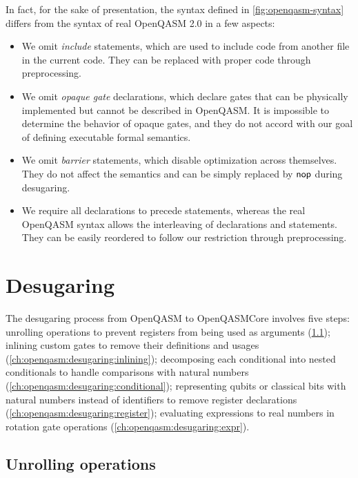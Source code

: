 In fact, for the sake of presentation, the syntax defined in
\cref{fig:openqasm-syntax} differs from the syntax of real OpenQASM 2.0 in a
few aspects:
%
\begin{itemize}
	\item We omit \emph{include} statements, which are used to include code from another
	      file in the current code.
	      They can be replaced with proper code through preprocessing.
	\item We omit \emph{opaque gate} declarations, which declare gates that can be
	      physically implemented but cannot be described in OpenQASM.
	      It is impossible to determine the behavior of opaque gates, and they do not
	      accord with our goal of defining executable formal semantics.
	\item We omit \emph{barrier} statements, which disable optimization across
	      themselves.
	      They do not affect the semantics and can be simply replaced by $\mathsf{nop}$ during
	      desugaring.
	\item We require all declarations to precede statements, whereas the real OpenQASM
	      syntax allows the interleaving of declarations and statements.
	      They can be easily reordered to follow our restriction through preprocessing.
\end{itemize}

\section{Desugaring}
\label{ch:openqasm:desugaring}

\noindent
The desugaring process from OpenQASM to OpenQASMCore involves five steps:
%
unrolling operations to prevent registers from being used as arguments
(\cref{ch:openqasm:desugaring:unrolling});
%
inlining custom gates to remove their definitions and usages
(\cref{ch:openqasm:desugaring:inlining});
%
decomposing each conditional into nested conditionals to handle comparisons
with natural numbers (\cref{ch:openqasm:desugaring:conditional});
%
representing qubits or classical bits with natural numbers instead of
identifiers to remove register declarations
(\cref{ch:openqasm:desugaring:register});
%
evaluating expressions to real numbers in rotation gate operations
(\cref{ch:openqasm:desugaring:expr}).

\subsection{Unrolling operations}
\label{ch:openqasm:desugaring:unrolling}

